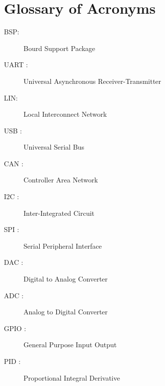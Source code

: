 \clearpage

\chapter*{Glossary of Acronyms}
\pagestyle{fancy}
\fancyhf{}
\cfoot{\thepage}
\vspace*{-2 cm}
\begin{description}
\item [BSP: ]Bourd Support Package
\item[UART :]Universal Asynchronous Receiver-Transmitter
\item[LIN: ]Local Interconnect Network
\item[USB :]Universal Serial Bus
\item[CAN :]Controller Area Network
\item[I2C :]Inter-Integrated Circuit
\item[SPI :]Serial Peripheral Interface
\item[DAC :]Digital to Analog Converter
\item[ADC :]Analog to Digital Converter
\item[GPIO :]General Purpose Input Output
\item[PID :]Proportional Integral Derivative
\\
\end{description}